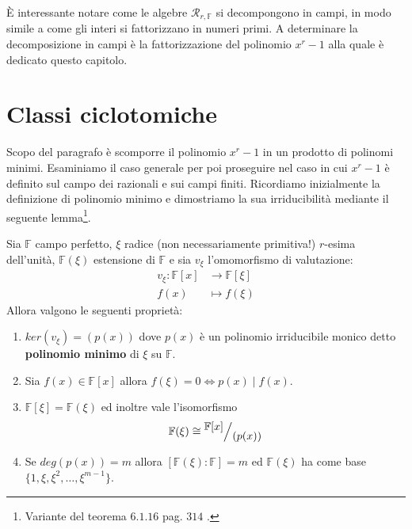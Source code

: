 \noindent
È interessante notare come le algebre $\mathcal{R}_{r, \mathbb{F}}$ si
decompongono in campi, in modo simile a come gli interi si fattorizzano in
numeri primi. A determinare la decomposizione in campi è la fattorizzazione del
polinomio $x^r - 1$ alla quale è dedicato questo capitolo.

\section{Classi ciclotomiche}

Scopo del paragrafo è scomporre il polinomio $x^r-1$ in un prodotto di polinomi minimi. Esaminiamo il caso generale per poi proseguire nel caso in cui $x^r-1$ è definito sul campo dei razionali e sui campi finiti. Ricordiamo inizialmente la definizione di polinomio minimo e dimostriamo la sua irriducibilità mediante il seguente lemma\footnote{Variante del teorema $6.1.16$ pag. $314$ \cite{cattaneo}.}.
\begin{lemmax}\label{le:poliMinimo}
   Sia $\mathbb{F}$ campo perfetto, $\xi$ radice (non necessariamente primitiva!) $r$-esima dell'unità,  $\mathbb{F}(\xi)$ estensione di  $\mathbb{F}$ e sia $v_{\xi}$ l'omomorfismo di valutazione:
   \begin{align*}
      v_{\xi}: \mathbb{F}[x]  &\longrightarrow  \mathbb{F}[\xi]  \\
		    f(x) &\longmapsto f(\xi)
   \end{align*}
   Allora valgono le seguenti proprietà: 
   \begin{enumerate}
      \item $ker(v_{\xi}) = (p(x))$ dove $p(x)$ è un polinomio irriducibile monico detto {\bf polinomio minimo} di $\xi $ su $\mathbb{F}$.
      \item Sia $f(x) \in \mathbb{F}[x]$ allora $f(\xi) = 0 \iff p(x) \mid f(x)$.
      \item $\mathbb{F}[\xi]=\mathbb{F}(\xi)$ ed inoltre vale l'isomorfismo
        \begin{align*}
           \mathbb{F}(\xi) \cong \quotient{\mathbb{F}[x]}{(p(x))}
        \end{align*}
       \item Se $deg(p(x)) = m$ allora $[\mathbb{F}(\xi): \mathbb{F}] = m$ ed $\mathbb{F}(\xi)$ ha come base $\lbrace1, \xi, \xi^2, \dots, \xi^{m-1} \rbrace$.
   \end{enumerate}
\end{lemmax}
